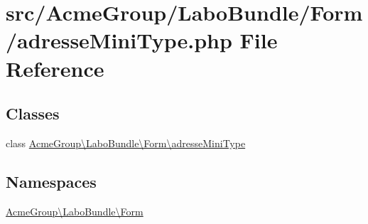 \hypertarget{adresse_mini_type_8php}{\section{src/\+Acme\+Group/\+Labo\+Bundle/\+Form/adresse\+Mini\+Type.php File Reference}
\label{adresse_mini_type_8php}
}
\subsection*{Classes}
\begin{DoxyCompactItemize}
\item 
class \hyperlink{class_acme_group_1_1_labo_bundle_1_1_form_1_1adresse_mini_type}{Acme\+Group\textbackslash{}\+Labo\+Bundle\textbackslash{}\+Form\textbackslash{}adresse\+Mini\+Type}
\end{DoxyCompactItemize}
\subsection*{Namespaces}
\begin{DoxyCompactItemize}
\item 
 \hyperlink{namespace_acme_group_1_1_labo_bundle_1_1_form}{Acme\+Group\textbackslash{}\+Labo\+Bundle\textbackslash{}\+Form}
\end{DoxyCompactItemize}
